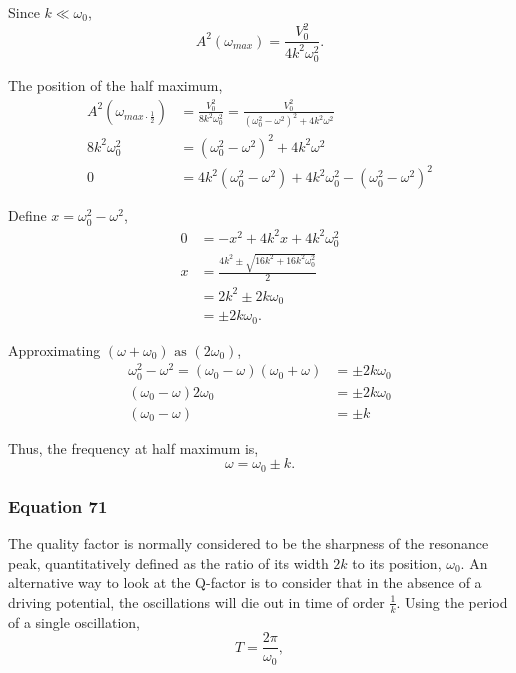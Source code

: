 \documentclass{article}
\begin{document}
Since $k \ll \omega_0$, 
\begin{equation}
    A^2(\omega_{max}) = \frac{V_0^2}{4k^2\omega_0^2}.
\end{equation}

The position of the half maximum,
\begin{equation}
    \begin{split}
    A^2(\omega_{max\cdot\frac{1}{2}}) &= \frac{V_0^2}{8k^2\omega_0^2}
    = \frac{V_0^2}{(\omega_0^2-\omega^2)^2+4k^2\omega^2} \\
    8k^2\omega_0^2 &= (\omega_0^2-\omega^2)^2+4k^2\omega^2 \\
    0 &= 4k^2(\omega_0^2-\omega^2)+4k^2\omega_0^2-(\omega_0^2-\omega^2)^2    
    \end{split}
\end{equation}

Define $x = \omega_0^2 - \omega^2$,
\begin{equation}
    \begin{split}
        0 &= -x^2+4k^2x+4k^2\omega_0^2 \\
        x &= \frac{4k^2\pm\sqrt{16k^2+16k^2\omega_0^2}}{2} \\
        &= 2k^2 \pm 2k\omega_0 \\
        &= \pm 2k\omega_0. 
    \end{split}
\end{equation}

Approximating $(\omega+\omega_0) \text{ as } (2\omega_0)$,
\begin{equation}
    \begin{split}
        \omega_0^2-\omega^2 = (\omega_0-\omega)(\omega_0+\omega) &= \pm 2k\omega_0 \\
        (\omega_0-\omega)2\omega_0 &= \pm 2k\omega_0 \\
        (\omega_0-\omega) &= \pm k
    \end{split}
\end{equation}

Thus, the frequency at half maximum is,
\begin{equation}
    \omega = \omega_0 \pm k.
\end{equation}

\subsubsection{Equation 71}
The quality factor is normally considered to be the sharpness of the resonance peak,
quantitatively defined as the ratio of its width $2k$ to its position, $\omega_0$. An
alternative way to look at the Q-factor is to consider that in the absence of a driving
potential, the oscillations will die out in time of order $\frac{1}{k}$. Using the 
period of a single oscillation,
\begin{equation}
    T = \frac{2\pi}{\omega_0},
\end{equation}
\end{document}
